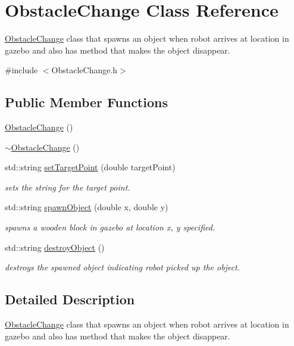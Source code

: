 \hypertarget{classObstacleChange}{}\section{Obstacle\+Change Class Reference}
\label{classObstacleChange}


\hyperlink{classObstacleChange}{Obstacle\+Change} class that spawns an object when robot arrives at location in gazebo and also has method that makes the object disappear.  




{\ttfamily \#include $<$Obstacle\+Change.\+h$>$}

\subsection*{Public Member Functions}
\begin{DoxyCompactItemize}
\item 
\hyperlink{classObstacleChange_a57f5c3efb9d59055477b82576393ae3a}{Obstacle\+Change} ()
\item 
\hyperlink{classObstacleChange_a7660d8cc43e71263870ac6d3558dc208}{$\sim$\+Obstacle\+Change} ()
\item 
std\+::string \hyperlink{classObstacleChange_a3a50e08dfade39833a7c3322d8f083a6}{set\+Target\+Point} (double target\+Point)
\begin{DoxyCompactList}\small\item\em sets the string for the target point. \end{DoxyCompactList}\item 
std\+::string \hyperlink{classObstacleChange_acd201b19981248a932a73f6ee892aea4}{spawn\+Object} (double x, double y)
\begin{DoxyCompactList}\small\item\em spawns a wooden block in gazebo at location x, y specified. \end{DoxyCompactList}\item 
std\+::string \hyperlink{classObstacleChange_a3aee4006b737cd0dd52b8c44fdcbd0e1}{destroy\+Object} ()
\begin{DoxyCompactList}\small\item\em destroys the spawned object indicating robot picked up the object. \end{DoxyCompactList}\end{DoxyCompactItemize}


\subsection{Detailed Description}
\hyperlink{classObstacleChange}{Obstacle\+Change} class that spawns an object when robot arrives at location in gazebo and also has method that makes the object disappear. 

